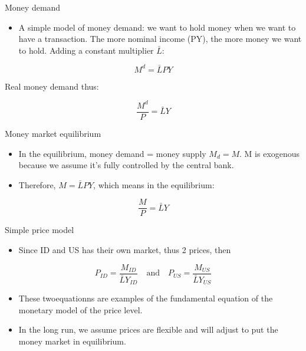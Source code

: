 \documentclass[
  ignorenonframetext,
]{beamer}
\providecommand{\tightlist}{%
  \setlength{\itemsep}{0pt}\setlength{\parskip}{0pt}}\usepackage{longtable,booktabs,array}
\begin{document}
\begin{frame}{Money demand}
\label{money-demand}
\begin{itemize}
\tightlist
\item
  A simple model of money demand: we want to hold money when we want to
  have a transaction. The more nominal income (PY), the more money we
  want to hold. Adding a constant multiplier \(\bar{L}\):
\end{itemize}

\begin{equation}
M^d=\bar{L}PY
\end{equation}

Real money demand thus:

\begin{equation}
\frac{M^d}{P}=\bar{L}Y
\end{equation}
\end{frame}

\begin{frame}{Money market equilibrium}
\label{money-market-equilibrium}
\begin{itemize}
\item
  In the equilibrium, money demand = money supply \(M_d=M\). M is
  exogenous because we assume it's fully controlled by the central bank.
\item
  Therefore, \(M=\bar{L}PY\), which means in the equilibrium:
\end{itemize}

\begin{equation}
\frac{M}{P}=\bar{L}Y
\end{equation}
\end{frame}

\begin{frame}{Simple price model}
\label{simple-price-model}
\begin{itemize}
\tightlist
\item
  Since ID and US has their own market, thus 2 prices, then
\end{itemize}

\begin{equation}
P_{ID}=\frac{M_{ID}}{\bar{L}Y_{ID}} \quad \text{and} \quad P_{US}=\frac{M_{US}}{\bar{L}Y_{US}}
\end{equation}

\begin{itemize}
\item
  These twoequationns are examples of the fundamental equation of the
  monetary model of the price level.
\item
  In the long run, we assume prices are flexible and will adjust to put
  the money market in equilibrium.
\end{itemize}
\end{frame}
\end{document}
